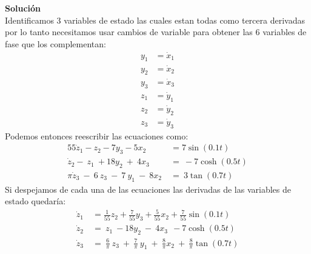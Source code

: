 \documentclass[letterpaper, 12pt]{article}
\begin{document}
\begin{enumerate}
\begin{enumerate}
\textbf{Solución} \\
Identificamos 3 variables de estado las cuales estan todas como tercera derivadas por lo tanto necesitamos usar cambios de variable para obtener las 6 variables de fase que los complementan:
\begin{equation}
\begin{split}
    y_1 &= \dot{x}_1 \\
    y_2 &= \dot{x}_2 \\
    y_3 &= \dot{x}_3 \\
    z_1 &= \dot{y}_1 \\
    z_2 &= \dot{y}_2 \\
    z_3 &= \dot{y}_3 \label{2.b.CambioV}
\end{split} 
\end{equation}
Podemos entonces reescribir las ecuaciones como:
\begin{align*}
    55\dot{z}_1-z_2-7y_3-5x_2 &= 7\sin(0.1t) \\
    {\dot{z}}_2-\ z_1\ +18y_2\ +\ 4x_3\ &=\ -7 \cosh(0.5t) \\
    \pi\dot{z}_3\ -\ 6\ z_3\ -\ 7\ y_1\ -\ 8x_2\ &=\ 3\tan(0.7t) \   
\end{align*}
Si despejamos de cada una de las ecuaciones las derivadas de las variables de estado quedaría:
 \begin{equation}
 \begin{split}
    \dot{z}_1&=\frac{1}{55}z_2+\frac{7}{55}y_3+\frac{5}{55}x_2+\frac{7}{55}\sin(0.1t) \\
    {\dot{z}}_2&=\ z_1\ -18y_2\ -\ 4x_3\ \ -7\cosh(0.5t)  \\
    \dot{z}_3\ &=\ \frac{6}{\pi}\ z_3\ +\ \frac{7}{\pi}\ y_1\ +\ \frac{8}{\pi}x_2\ +\ \frac{8}{\pi}\tan(0.7t)
    \label{1.b.mainV}
\end{split}
\end{equation}


\end{enumerate}
\end{enumerate}
\end{document}
